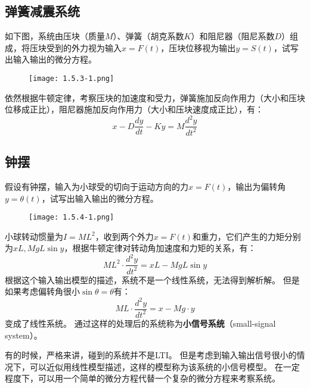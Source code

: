 \subsection{弹簧减震系统}

\begin{example}
如下图，系统由压块（质量$M$）、弹簧（胡克系数$K$）和阻尼器（阻尼系数$D$）组成，将压块受到的外力视为输入$x=F\left( t \right) $，压块位移视为输出$y=S\left( t \right) $，试写出输入输出的微分方程。
\end{example}

\begin{figure}[h]
\centering
\texttt{[image: 1.5.3-1.png]}
\end{figure}

依然根据牛顿定律，考察压块的加速度和受力，弹簧施加反向作用力（大小和压块位移成正比），阻尼器施加反向作用力（大小和压块速度成正比），有：
\[
x-D\frac{dy}{dt}-Ky=M\frac{d^2y}{dt^2}
\]

\subsection{钟摆}

\begin{example}
假设有钟摆，输入为小球受的切向于运动方向的力$x=F\left( t \right) $，输出为偏转角$y=\theta \left( t \right) $，试写出输入输出的微分方程。
\end{example}

\begin{figure}[h]
\centering
\texttt{[image: 1.5.4-1.png]}
\end{figure}

小球转动惯量为$I=ML^2$，收到两个外力$x=F\left( t \right) $和重力，它们产生的力矩分别为$xL,MgL\sin y$，根据牛顿定律对转动角加速度和力矩的关系，有：
\[
ML^2\cdot \frac{d^2y}{dt^2}=xL-MgL\sin y
\]
根据这个输入输出模型的描述，系统不是一个线性系统，无法得到解析解。
但是如果考虑偏转角很小$\sin \theta =\theta $有：
\[
ML\cdot \frac{d^2y}{dt^2}=x-Mg\cdot y
\]
变成了线性系统。
通过这样的处理后的系统称为{\bf 小信号系统}（small-signal system）。

\begin{tcolorbox}
有的时候，严格来讲，碰到的系统并不是LTI。
但是考虑到输入输出信号很小的情况下，可以近似用线性模型描述，这样的模型称为该系统的小信号模型。
在一定程度下，可以用一个简单的微分方程代替一个复杂的微分方程来考察系统。
\end{tcolorbox}




